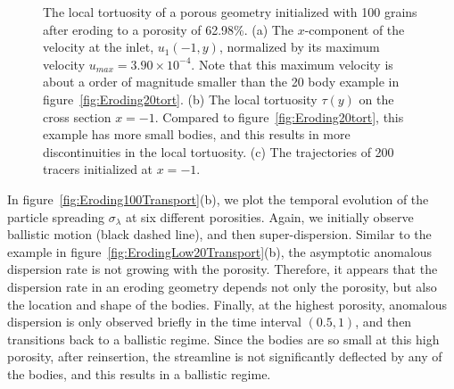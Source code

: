 \documentclass{jfm}
\begin{document}
\begin{figure}
\begin{subfigure}[b]{0.5\textwidth}
\caption{}
\end{subfigure}
\caption{\label{fig:Eroding100tort} The local tortuosity of a porous
geometry initialized with 100 grains after eroding to a porosity of
62.98\%.  (a) The $x$-component of the velocity at the inlet, $u_1(-1,
y)$, normalized by its maximum velocity $u_{max}=3.90 \times 10^{-4}$.
Note that this maximum velocity is about a order of magnitude smaller
than the 20 body example in figure~\ref{fig:Eroding20tort}.  (b) The
local tortuosity $\tau(y)$ on the cross section $x = -1$. Compared to
figure~\ref{fig:Eroding20tort}, this example has more small bodies, and
this results in more discontinuities in the local tortuosity.  (c) The
trajectories of 200 tracers initialized at $x = -1$.}
\end{figure}

In figure~\ref{fig:Eroding100Transport}(b), we plot the temporal
evolution of the particle spreading $\sigma_\lambda$ at six different
porosities. Again, we initially observe ballistic motion (black dashed
line), and then super-dispersion.  Similar to the example in
figure~\ref{fig:ErodingLow20Transport}(b), the asymptotic anomalous
dispersion rate is not growing with the porosity.  Therefore, it appears
that the dispersion rate in an eroding geometry depends not only the
porosity, but also the location and shape of the bodies.  Finally, at
the highest porosity, anomalous dispersion is only observed briefly in
the time interval $(0.5,1)$, and then transitions back to a ballistic
regime.  Since the bodies are so small at this high porosity, after
reinsertion, the streamline is not significantly deflected by any of the
bodies, and this results in a ballistic regime.
\end{document}
